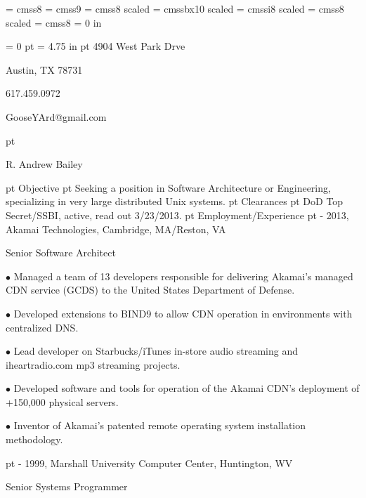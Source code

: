 
\relax
\pdfpagewidth=8.26in  
\pdfpageheight=11.69in 
\font\hf = cmss8
\font\body = cmss9
\font\myname = cmss8 scaled 
\font\category = cmssbx10 scaled 
\font\position = cmssi8 scaled 
\font\anitem = cmss8 scaled 
\font\content = cmss8 
\nopagenumbers
\parindent = 0 in
\body
{ 
\hf
\parskip = 0 pt
\parindent = 4.75 in
 pt
4904 West Park Drve

Austin, TX 78731

617.459.0972

GooseYArd@gmail.com

}

 pt
{ \myname \centerline{R. Andrew Bailey} \par }
 pt
{\category Objective}
 pt
Seeking a position in Software Architecture or Engineering, specializing in very large distributed Unix systems.
 pt
{\category Clearances}
 pt
DoD Top Secret/SSBI, active, read out 3/23/2013.
 pt
{\category Employment/Experience}
 pt
{ - 2013,	Akamai Technologies,	Cambridge, MA/Reston, VA}

{\position Senior Software Architect}

\item{$\bullet$} Managed a team of 13 developers responsible for delivering Akamai's managed CDN service (GCDS) to the United States Department of Defense.

\item{$\bullet$} Developed extensions to BIND9 to allow CDN operation in environments with centralized DNS.

\item{$\bullet$} Lead developer on Starbucks/iTunes in-store audio streaming and iheartradio.com mp3 streaming projects.

\item{$\bullet$} Developed software and tools for operation of the Akamai CDN's deployment of +150,000 physical servers.

\item{$\bullet$} Inventor of Akamai's patented remote operating system installation methodology.

 pt
{ - 1999,	Marshall University Computer Center,	Huntington, WV}

{\position Senior Systems Programmer}

